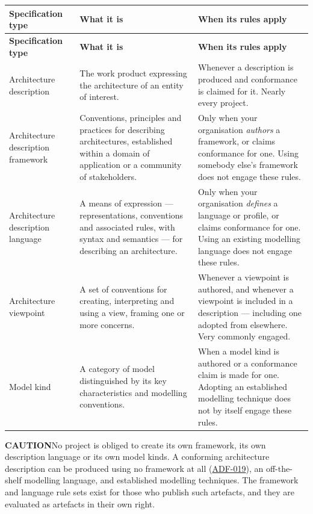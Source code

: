 \documentclass[11pt,a4paper]{report}
\newcommand{\calloutlead}[2]{{\sffamily\bfseries\footnotesize\color{#1}#2\quad}}
\newcommand{\risknote}[1]{\begin{riskbox}\calloutlead{brick}{CAUTION}#1\end{riskbox}}
\newcommand{\rref}[1]{\hyperref[rule:#1]{\textsf{\small #1}}}
\begin{document}
\begin{center}
\small
\begin{longtable}{@{}L{30mm} L{56mm} L{50mm}@{}}
\toprule
\textbf{Specification type} & \textbf{What it is} & \textbf{When its rules apply} \\
\midrule
\endfirsthead
\toprule
\textbf{Specification type} & \textbf{What it is} & \textbf{When its rules apply} \\
\midrule
\endhead
\bottomrule
\endfoot
Architecture description
  & The work product expressing the architecture of an entity of interest.
  & Whenever a description is produced and conformance is claimed for it.
    Nearly every project. \\
\addlinespace
Architecture description framework
  & Conventions, principles and practices for describing architectures, established
    within a domain of application or a community of stakeholders.
  & Only when your organisation \emph{authors} a framework, or claims conformance
    for one. Using somebody else's framework does not engage these rules. \\
\addlinespace
Architecture description language
  & A means of expression --- representations, conventions and associated rules,
    with syntax and semantics --- for describing an architecture.
  & Only when your organisation \emph{defines} a language or profile, or claims
    conformance for one. Using an existing modelling language does not engage
    these rules. \\
\addlinespace
Architecture viewpoint
  & A set of conventions for creating, interpreting and using a view, framing one
    or more concerns.
  & Whenever a viewpoint is authored, and whenever a viewpoint is included in a
    description --- including one adopted from elsewhere. Very commonly engaged. \\
\addlinespace
Model kind
  & A category of model distinguished by its key characteristics and modelling
    conventions.
  & When a model kind is authored or a conformance claim is made for one.
    Adopting an established modelling technique does not by itself engage these
    rules. \\
\bottomrule
\end{longtable}
\end{center}

\risknote{No project is obliged to create its own framework, its own description
language or its own model kinds. A conforming architecture description can be
produced using no framework at all (\rref{ADF-019}), an
off-the-shelf modelling language, and established modelling techniques. The
framework and language rule sets exist for those who publish such artefacts, and
they are evaluated as artefacts in their own right.}
\end{document}
